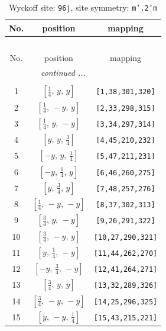 \documentclass[fleqn,8pt]{jsarticle}
\begin{document}
\begin{longtable}{ccc}
\caption{Wyckoff site: {\tt 96j}, site symmetry: {\tt m'.2'm}}
 \\
 \hline \hline
No. & position & mapping \\ \hline \endfirsthead

\multicolumn{2}{l}{\tablename\ \thetable{}} \\
 \hline \hline
No. & position & mapping \\ \hline \endhead

 \hline \hline
\multicolumn{2}{r}{\footnotesize\it continued ...} \\ \endfoot

 \hline \hline
\multicolumn{2}{r}{} \\ \endlastfoot

1 & $\left[ \frac{1}{4},\, y,\, y \right]$ & {\tt [1,38,301,320]} \\ \hline
2 & $\left[ \frac{1}{4},\, - y,\, y \right]$ & {\tt [2,33,298,315]} \\ \hline
3 & $\left[ \frac{1}{4},\, y,\, - y \right]$ & {\tt [3,34,297,314]} \\ \hline
4 & $\left[ y,\, y,\, \frac{3}{4} \right]$ & {\tt [4,45,210,232]} \\ \hline
5 & $\left[ - y,\, y,\, \frac{1}{4} \right]$ & {\tt [5,47,211,231]} \\ \hline
6 & $\left[ - y,\, \frac{1}{4},\, y \right]$ & {\tt [6,46,260,275]} \\ \hline
7 & $\left[ y,\, \frac{3}{4},\, y \right]$ & {\tt [7,48,257,276]} \\ \hline
8 & $\left[ \frac{1}{4},\, - y,\, - y \right]$ & {\tt [8,37,302,313]} \\ \hline
9 & $\left[ \frac{3}{4},\, y,\, - y \right]$ & {\tt [9,26,291,322]} \\ \hline
10 & $\left[ \frac{3}{4},\, - y,\, y \right]$ & {\tt [10,27,290,321]} \\ \hline
11 & $\left[ y,\, \frac{1}{4},\, - y \right]$ & {\tt [11,44,262,270]} \\ \hline
12 & $\left[ - y,\, \frac{3}{4},\, - y \right]$ & {\tt [12,41,264,271]} \\ \hline
13 & $\left[ \frac{3}{4},\, y,\, y \right]$ & {\tt [13,32,289,326]} \\ \hline
14 & $\left[ \frac{3}{4},\, - y,\, - y \right]$ & {\tt [14,25,296,325]} \\ \hline
15 & $\left[ y,\, - y,\, \frac{1}{4} \right]$ & {\tt [15,43,215,221]} \\ \hline

\end{longtable}
\end{document}
